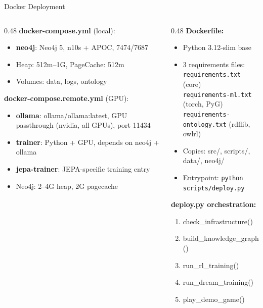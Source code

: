 \documentclass[aspectratio=169, 10pt]{beamer}
\begin{document}
\begin{frame}{Docker Deployment}
  \begin{columns}[T]
    \begin{column}{0.48\textwidth}
      \footnotesize
      \textbf{docker-compose.yml} (local):
      \begin{itemize}\scriptsize
        \item \textbf{neo4j}: Neo4j 5, n10s + APOC, 7474/7687
        \item Heap: 512m--1G, PageCache: 512m
        \item Volumes: data, logs, ontology
      \end{itemize}
      \vspace{0.2cm}
      \textbf{docker-compose.remote.yml} (GPU):
      \begin{itemize}\scriptsize
        \item \textbf{ollama}: ollama/ollama:latest, GPU passthrough (nvidia, all GPUs), port 11434
        \item \textbf{trainer}: Python + GPU, depends on neo4j + ollama
        \item \textbf{jepa-trainer}: JEPA-specific training entry
        \item Neo4j: 2--4G heap, 2G pagecache
      \end{itemize}
    \end{column}
    \begin{column}{0.48\textwidth}
      \footnotesize
      \textbf{Dockerfile:}
      \begin{itemize}\scriptsize
        \item Python 3.12-slim base
        \item 3 requirements files:\\
              \texttt{requirements.txt} (core)\\
              \texttt{requirements-ml.txt} (torch, PyG)\\
              \texttt{requirements-ontology.txt} (rdflib, owlrl)
        \item Copies: src/, scripts/, data/, neo4j/
        \item Entrypoint: \texttt{python scripts/deploy.py}
      \end{itemize}
      \vspace{0.2cm}
      \textbf{deploy.py orchestration:}
      \begin{enumerate}\scriptsize
        \item check\_infrastructure()
        \item build\_knowledge\_graph()
        \item run\_rl\_training()
        \item run\_dream\_training()
        \item play\_demo\_game()
      \end{enumerate}
    \end{column}
  \end{columns}
\end{frame}
\end{document}
